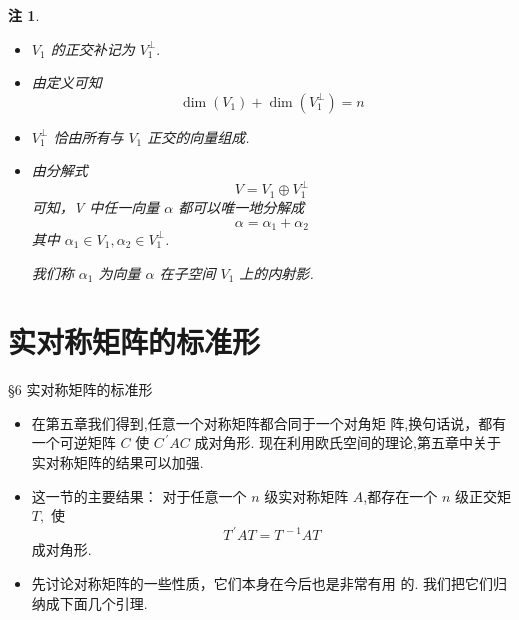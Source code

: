 \documentclass[13pt]{beamer}
\newtheorem*{rem}{注}
\def\dim{\operatorname{dim}}
\begin{document}
\begin{frame}
\begin{rem}
\begin{itemize}
\item $V_{1}$ 的正交补记为 $V_{1}^{\perp} .$ 
\item 由定义可知
$$
{\dim}\left(V_{1}\right)+{\dim} \left(V_{1}^{\perp}\right)=n
$$

\item $V_{1}^{\perp}$ 恰由所有与 $V_{1}$ 正交的向量组成.

\item  由分解式
\[
V=V_{1} \oplus V_{1}^{\perp}
\]
可知，V 中任一向量 ${\alpha}$ 都可以唯一地分解成
\[
{\alpha}={\alpha}_{1}+{\alpha}_{2}
\]
其中 ${\alpha}_{1} \in V_{1}, {\alpha}_{2} \in V_{1}^{\perp}$. 

我们称 ${\alpha}_{1}$ 为向量 ${\alpha}$ 在子空间 $V_{1}$ 上的\alert{内射影}.
\end{itemize}
\end{rem}

\end{frame}


\section{实对称矩阵的标准形}
\begin{frame}{\S {6}  实对称矩阵的标准形}
\begin{itemize}
\item 在第五章我们得到,任意一个对称矩阵都合同于一个对角矩 阵,换句话说，都有一个可逆矩阵 $C$ 使 ${C}^{\, \prime} {A} {C}$
成对角形.
现在利用欧氏空间的理论,第五章中关于实对称矩阵的结果可以加强.

\item 这一节的主要结果： 对于任意一个 $n$ 级实对称矩阵 $A$,都存在一个 $n$ 级正交矩
${T},$ 使
\[
{T}^{\, \prime} {A} {T}={T}^{\, -1} {A} {T}
\]
成对角形. 

\item 先讨论对称矩阵的一些性质，它们本身在今后也是非常有用
的. 我们把它们归纳成下面几个引理.
\end{itemize}
\end{frame}
\end{document}
